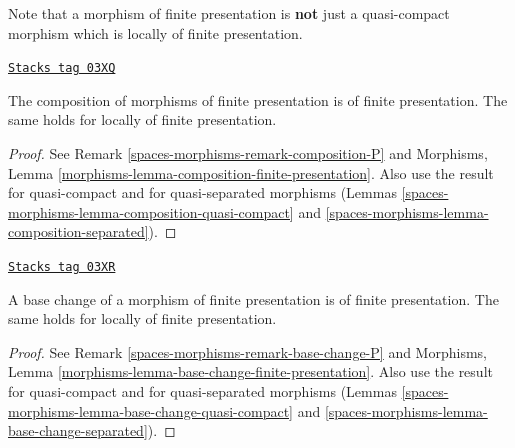 Note that a morphism of finite presentation is {\bf not} just a quasi-compact
morphism which is locally of finite presentation.

\begin{lemma}
\label{spaces-morphisms-lemma-composition-finite-presentation}
\href{https://stacks.math.columbia.edu/tag/03XQ}{\texttt{Stacks tag 03XQ}}

The composition of morphisms of finite presentation is of finite presentation.
The same holds for locally of finite presentation.
\end{lemma}

\begin{proof}
See Remark \ref{spaces-morphisms-remark-composition-P} and
Morphisms, Lemma \ref{morphisms-lemma-composition-finite-presentation}.
Also use the result for quasi-compact and for quasi-separated morphisms
(Lemmas \ref{spaces-morphisms-lemma-composition-quasi-compact} and
\ref{spaces-morphisms-lemma-composition-separated}).
\end{proof}

\begin{lemma}
\label{spaces-morphisms-lemma-base-change-finite-presentation}
\href{https://stacks.math.columbia.edu/tag/03XR}{\texttt{Stacks tag 03XR}}

A base change of a morphism of finite presentation is of finite presentation.
The same holds for locally of finite presentation.
\end{lemma}

\begin{proof}
See Remark \ref{spaces-morphisms-remark-base-change-P} and
Morphisms, Lemma \ref{morphisms-lemma-base-change-finite-presentation}.
Also use the result for quasi-compact and for quasi-separated morphisms
(Lemmas \ref{spaces-morphisms-lemma-base-change-quasi-compact} and
\ref{spaces-morphisms-lemma-base-change-separated}).
\end{proof}

